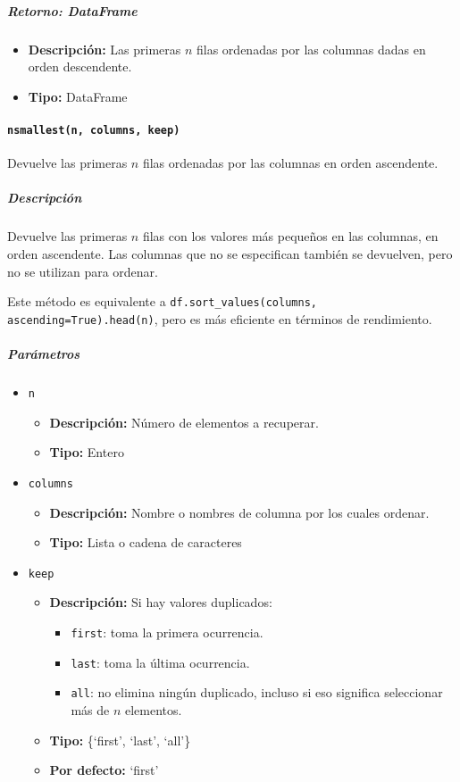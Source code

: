 \subparagraph{\textbf{Retorno:} DataFrame}
\begin{itemize}
    \item \textbf{Descripción:} Las primeras \( n \) filas ordenadas por las
          columnas dadas en orden descendente.
    \item \textbf{Tipo:} DataFrame
\end{itemize}

\paragraph{\texttt{nsmallest(n, columns, keep)}} Devuelve las primeras \( n \)
filas ordenadas por las columnas en orden ascendente.

\subparagraph{\textbf{Descripción}}
Devuelve las primeras \( n \) filas con los valores más pequeños en las
columnas, en orden ascendente. Las columnas que no se especifican también se
devuelven, pero no se utilizan para ordenar.

Este método es equivalente a \texttt{df.sort\_values(columns,
    ascending=True).head(n)}, pero es más eficiente en términos de rendimiento.

\subparagraph{\textbf{Parámetros}}
\begin{itemize}
    \item \texttt{n}
          \begin{itemize}
              \item \textbf{Descripción:} Número de elementos a recuperar.
              \item \textbf{Tipo:} Entero
          \end{itemize}
    \item \texttt{columns}
          \begin{itemize}
              \item \textbf{Descripción:} Nombre o nombres de columna por los
                    cuales ordenar.
              \item \textbf{Tipo:} Lista o cadena de caracteres
          \end{itemize}
    \item \texttt{keep}
          \begin{itemize}
              \item \textbf{Descripción:} Si hay valores duplicados:
                    \begin{itemize}
                        \item \texttt{first}: toma la primera ocurrencia.
                        \item \texttt{last}: toma la última ocurrencia.
                        \item \texttt{all}: no elimina ningún duplicado,
                              incluso si eso significa seleccionar más de \( n \) elementos.
                    \end{itemize}
              \item \textbf{Tipo:} \{`first', `last', `all'\}
              \item \textbf{Por defecto:} `first'
          \end{itemize}
\end{itemize}

